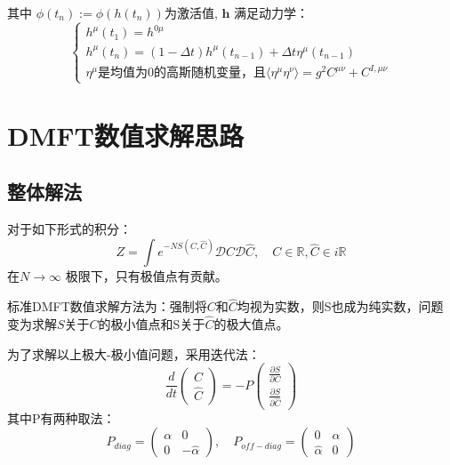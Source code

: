 \documentclass[UTF8]{ctexart}
\begin{document}
    其中 $\phi(t_n):=\phi(h(t_n))$为激活值, $\mathbf{h}$ 满足动力学：
    \begin{equation}
        \begin{cases}
        h^{\mu}(t_1) = h^{0\mu}\\
        h^{\mu}(t_n) = (1 - \Delta t)h^{\mu}(t_{n-1}) + \Delta t\eta^\mu(t_{n-1}) \\
        \eta^\mu\text{是均值为0的高斯随机变量，且}\langle \eta^\mu \eta^\nu \rangle =g^2 C^{\mu \nu} + C^{I, \mu \nu}
        \end{cases}
    \end{equation}


\section{DMFT数值求解思路}
    \subsection{整体解法}
    对于如下形式的积分：
    \begin{equation}
        Z = \int e^{-NS(C, \hat{C})} \mathcal{D}C \mathcal{D}\hat{C}, \quad C \in \mathbb{R},\hat{C} \in i \mathbb{R}
    \end{equation}
    在$N \to \infty$ 极限下，只有极值点有贡献。

    \par 标准DMFT数值求解方法为：强制将$C$和$\hat{C}$均视为实数，则S也成为纯实数，问题变为求解$S$关于$C$的极小值点和S关于$\hat{C}$的极大值点。

    \par 为了求解以上极大-极小值问题，采用迭代法：
    \begin{equation}
        \frac{d}{dt}\begin{pmatrix}C\\\hat{C}\end{pmatrix}=-P \begin{pmatrix}
            \frac{\partial S}{\partial C}\\
            \frac{\partial S}{\partial \hat{C}}
        \end{pmatrix}
    \end{equation}
    其中P有两种取法：
    \begin{equation}
        P_{diag} = \begin{pmatrix}
            \alpha & 0 \\
            0 & -\hat{\alpha}
        \end{pmatrix}, 
        \quad P_{off-diag}=\begin{pmatrix}
            0 & \alpha \\
            \hat{\alpha} & 0
        \end{pmatrix}
    \end{equation}
\end{document}
